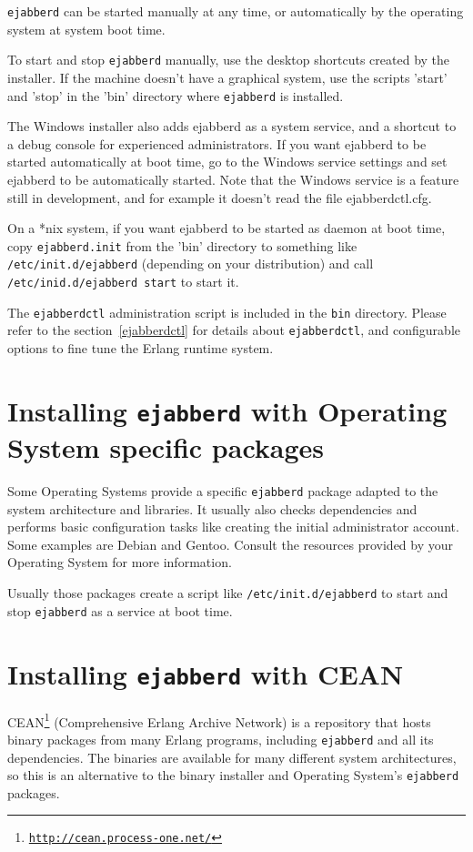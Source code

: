 \documentclass[a4paper,10pt]{book}
\newcommand{\term}[1]{\texttt{#1}}
\newcommand{\ejabberd}{\texttt{ejabberd}}
\gdef\footahref#1#2{#2\footnote{\href{#1}{\texttt{#1}}}}
\begin{document}
\ejabberd{} can be started manually at any time,
or automatically by the operating system at system boot time.

To start and stop \ejabberd{} manually,
use the desktop shortcuts created by the installer.
If the machine doesn't have a graphical system, use the scripts 'start' 
and 'stop' in the 'bin' directory where \ejabberd{} is installed.

The Windows installer also adds ejabberd as a system service,
and a shortcut to a debug console for experienced administrators.
If you want ejabberd to be started automatically at boot time, 
go to the Windows service settings and set ejabberd to be automatically started.
Note that the Windows service is a feature still in development, 
and for example it doesn't read the file ejabberdctl.cfg.

On a *nix system, if you want ejabberd to be started as daemon at boot time, 
copy \term{ejabberd.init} from the 'bin' directory to something like \term{/etc/init.d/ejabberd}
(depending on your distribution) and call \term{/etc/inid.d/ejabberd start} to start it.

The \term{ejabberdctl} administration script is included in the \term{bin} directory.
Please refer to the section~\ref{ejabberdctl} for details about \term{ejabberdctl},
and configurable options to fine tune the Erlang runtime system.

\section{Installing \ejabberd{} with Operating System specific packages}

Some Operating Systems provide a specific \ejabberd{} package adapted to 
the system architecture and libraries.
It usually also checks dependencies 
and performs basic configuration tasks like creating the initial
administrator account. Some examples are Debian and Gentoo. Consult the
resources provided by your Operating System for more information.

Usually those packages create a script like \term{/etc/init.d/ejabberd}
to start and stop \ejabberd{} as a service at boot time.

\section{Installing \ejabberd{} with CEAN}

\footahref{http://cean.process-one.net/}{CEAN}
(Comprehensive Erlang Archive Network) is a repository that hosts binary
packages from many Erlang programs, including \ejabberd{} and all its dependencies.
The binaries are available for many different system architectures, so this is an
alternative to the binary installer and Operating System's \ejabberd{} packages.
\end{document}
